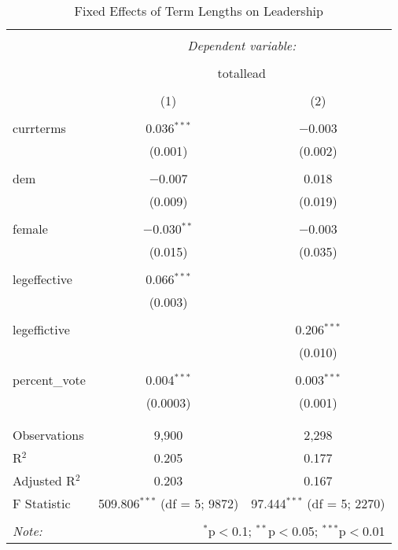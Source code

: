 
\begin{table}[!htbp] \centering 
  \caption{Fixed Effects of Term Lengths on Leadership} 
  \label{} 
\begin{tabular}{@{\extracolsep{5pt}}lcc} 
\\[-1.8ex]\hline 
\hline \\[-1.8ex] 
 & \multicolumn{2}{c}{\textit{Dependent variable:}} \\ 
\cline{2-3} 
\\[-1.8ex] & \multicolumn{2}{c}{totallead} \\ 
\\[-1.8ex] & (1) & (2)\\ 
\hline \\[-1.8ex] 
 currterms & 0.036$^{***}$ & $-$0.003 \\ 
  & (0.001) & (0.002) \\ 
  & & \\ 
 dem & $-$0.007 & 0.018 \\ 
  & (0.009) & (0.019) \\ 
  & & \\ 
 female & $-$0.030$^{**}$ & $-$0.003 \\ 
  & (0.015) & (0.035) \\ 
  & & \\ 
 legeffective & 0.066$^{***}$ &  \\ 
  & (0.003) &  \\ 
  & & \\ 
 legeffictive &  & 0.206$^{***}$ \\ 
  &  & (0.010) \\ 
  & & \\ 
 percent\_vote & 0.004$^{***}$ & 0.003$^{***}$ \\ 
  & (0.0003) & (0.001) \\ 
  & & \\ 
\hline \\[-1.8ex] 
Observations & 9,900 & 2,298 \\ 
R$^{2}$ & 0.205 & 0.177 \\ 
Adjusted R$^{2}$ & 0.203 & 0.167 \\ 
F Statistic & 509.806$^{***}$ (df = 5; 9872) & 97.444$^{***}$ (df = 5; 2270) \\ 
\hline 
\hline \\[-1.8ex] 
\textit{Note:}  & \multicolumn{2}{r}{$^{*}$p$<$0.1; $^{**}$p$<$0.05; $^{***}$p$<$0.01} \\ 
\end{tabular} 
\end{table} 
